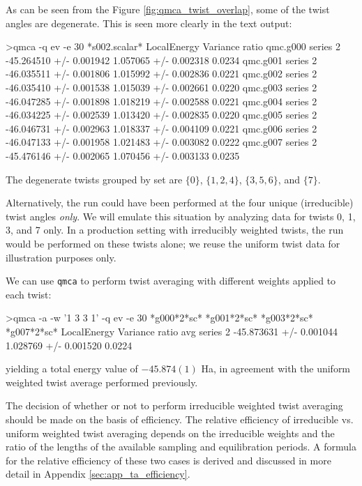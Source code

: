 As can be seen from the Figure \ref{fig:qmca_twist_overlap}, some of the twist 
angles are degenerate. This is seen more clearly in the text output:
\begin{shade}
>qmca -q ev -e 30 *s002.scalar*
                            LocalEnergy               Variance           ratio 
qmc.g000  series 2  -45.264510 +/- 0.001942   1.057065 +/- 0.002318   0.0234 
qmc.g001  series 2  -46.035511 +/- 0.001806   1.015992 +/- 0.002836   0.0221 
qmc.g002  series 2  -46.035410 +/- 0.001538   1.015039 +/- 0.002661   0.0220 
qmc.g003  series 2  -46.047285 +/- 0.001898   1.018219 +/- 0.002588   0.0221 
qmc.g004  series 2  -46.034225 +/- 0.002539   1.013420 +/- 0.002835   0.0220 
qmc.g005  series 2  -46.046731 +/- 0.002963   1.018337 +/- 0.004109   0.0221 
qmc.g006  series 2  -46.047133 +/- 0.001958   1.021483 +/- 0.003082   0.0222 
qmc.g007  series 2  -45.476146 +/- 0.002065   1.070456 +/- 0.003133   0.0235 
\end{shade}
\noindent
The degenerate twists grouped by set are $\{0\}$, $\{1,2,4\}$, $\{3,5,6\}$, and
$\{7\}$.

Alternatively, the run could have been performed at the four 
unique (irreducible) twist angles \emph{only}.  We will emulate this situation by 
analyzing data for twists 0, 1, 3, and 7 only.  In a production setting 
with irreducibly weighted twists, the run would be performed on these twists 
alone; we reuse the uniform twist data for illustration purposes only.  

We can use \texttt{qmca} to perform twist averaging with different 
weights applied to each twist:
\begin{shade}
>qmca -a -w '1 3 3 1' -q ev -e 30 *g000*2*sc* *g001*2*sc* *g003*2*sc* *g007*2*sc*
                            LocalEnergy               Variance           ratio 
avg  series 2  -45.873631 +/- 0.001044   1.028769 +/- 0.001520   0.0224 
\end{shade}
\noindent
yielding a total energy value of $-45.874(1)$ Ha, in agreement with the 
uniform weighted twist average performed previously.  

The decision of whether or not to perform irreducible weighted twist 
averaging should be made on the basis of efficiency.  The relative 
efficiency of irreducible vs. uniform weighted twist averaging 
depends on the irreducible weights and the ratio of the lengths of 
the available sampling and equilibration periods.  A formula for 
the relative efficiency of these two cases is derived and discussed 
in more detail in Appendix \ref{sec:app_ta_efficiency}.


